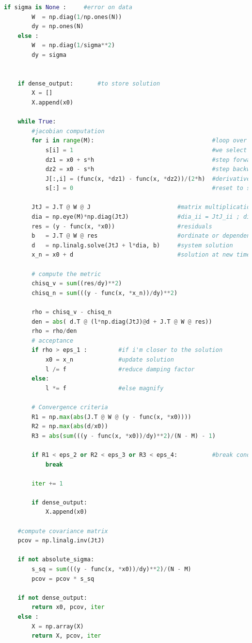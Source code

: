\documentclass[10pt,a4paper]{article}
\begin{document}
\begin{lstlisting}[language=Python]
    if sigma is None :     #error on data
        W  = np.diag(1/np.ones(N))
        dy = np.ones(N)
    else :
        W  = np.diag(1/sigma**2)
        dy = sigma


    if dense_output:       #to store solution
        X = []
        X.append(x0)

    while True:
        #jacobian computation
        for i in range(M):                                  #loop over variables
            s[i] = 1                                        #we select one variable at a time
            dz1 = x0 + s*h                                  #step forward
            dz2 = x0 - s*h                                  #step backward
            J[:,i] = (func(x, *dz1) - func(x, *dz2))/(2*h)  #derivative along z's direction
            s[:] = 0                                        #reset to select the other variables

        JtJ = J.T @ W @ J                         #matrix multiplication, JtJ is an MxM matrix
        dia = np.eye(M)*np.diag(JtJ)              #dia_ii = JtJ_ii ; dia_ij = 0
        res = (y - func(x, *x0))                  #residuals
        b   = J.T @ W @ res                       #ordinate or dependent variable values of system
        d   = np.linalg.solve(JtJ + l*dia, b)     #system solution
        x_n = x0 + d                              #solution at new time

        # compute the metric
        chisq_v = sum((res/dy)**2)
        chisq_n = sum(((y - func(x, *x_n))/dy)**2)

        rho = chisq_v - chisq_n
        den = abs( d.T @ (l*np.diag(JtJ)@d + J.T @ W @ res))
        rho = rho/den
        # acceptance
        if rho > eps_1 :         #if i'm closer to the solution
            x0 = x_n             #update solution
            l /= f               #reduce damping factor
        else:
            l *= f               #else magnify

        # Convergence criteria
        R1 = np.max(abs(J.T @ W @ (y - func(x, *x0))))
        R2 = np.max(abs(d/x0))
        R3 = abs(sum(((y - func(x, *x0))/dy)**2)/(N - M) - 1)

        if R1 < eps_2 or R2 < eps_3 or R3 < eps_4:          #break condition
            break

        iter += 1

        if dense_output:
            X.append(x0)

    #compute covariance matrix
    pcov = np.linalg.inv(JtJ)

    if not absolute_sigma:
        s_sq = sum(((y - func(x, *x0))/dy)**2)/(N - M)
        pcov = pcov * s_sq

    if not dense_output:
        return x0, pcov, iter
    else :
        X = np.array(X)
        return X, pcov, iter
\end{lstlisting}
\end{document}
